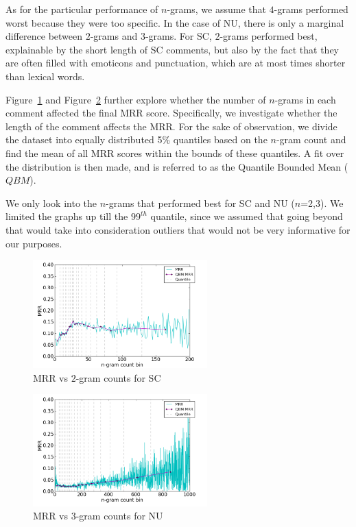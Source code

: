 As for the particular performance of $n$-grams, we assume that $4$-grams performed worst because they were too specific. In the case of NU, there is only a marginal difference between $2$-grams and $3$-grams. For SC, $2$-grams performed best, explainable by the short length of SC comments, but also by the fact that they are
 often filled with emoticons and punctuation, which are at most times shorter than lexical words.

Figure~\ref{fig:sc_feat_mrr} and Figure~\ref{fig:nu_feat_mrr} further explore whether the number of $n$-grams in each comment affected the final MRR score. Specifically, we investigate whether the length of the comment affects the MRR. For the sake of observation, we divide the dataset into equally distributed 5\% quantiles based on the $n$-gram count and find the mean of all MRR scores within the bounds of these quantiles. A fit over the distribution is then made, and is referred to as the Quantile Bounded Mean ($QBM$).

We only look into the $n$-grams that performed best for SC and NU ($n$=2,3). We limited the graphs up till the $99^{th}$ quantile, since we assumed that going beyond that would take into consideration outliers that would not be very informative for our purposes. 

\begin{figure}[!h]
\centering
\includegraphics[width=0.6\textwidth]{c-3_images/sc_feat_mrr.png}
\caption{MRR vs $2$-gram counts for SC}
\label{fig:sc_feat_mrr}
\end{figure}

\begin{figure}[!h]
\centering
\includegraphics[width=0.6\textwidth]{c-3_images/nu_feat_mrr.png}
\caption{MRR vs $3$-gram counts for NU}
\label{fig:nu_feat_mrr}
\end{figure}

